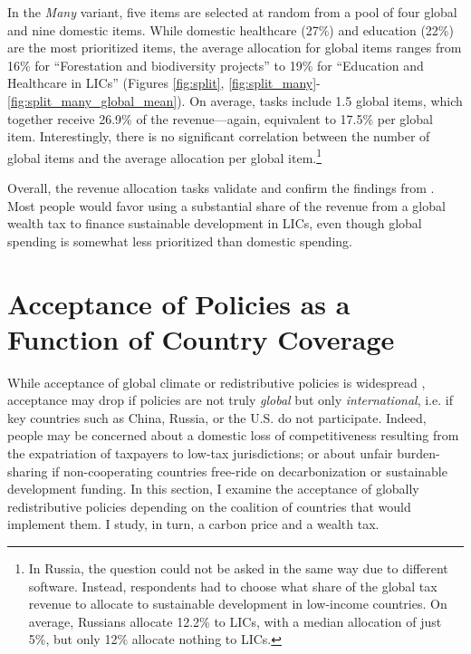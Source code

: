 \documentclass[12pt,english]{article}
\begin{document}
\begin{bibunit}
In the \textit{Many} variant, five items are selected at random from a pool of four global and nine domestic items. While domestic healthcare (27\%)
and education (22\%)
are the most prioritized items, the average allocation for global items ranges from 16\%
for ``Forestation and biodiversity projects'' to 19\%
for ``Education and Healthcare in LICs'' (Figures \ref{fig:split}, \ref{fig:split_many}-\ref{fig:split_many_global_mean}). On average, tasks include 1.5 global items, which together receive 26.9\% of the revenue---again, equivalent to 17.5\% per global item. Interestingly, there is no significant correlation between the number of global items and the average allocation per global item.\footnote{In Russia, the question could not be asked in the same way due to different software. Instead, respondents had to choose what share of the global tax revenue to allocate to sustainable development in low-income countries. On average, Russians allocate 12.2\% to LICs, with a median allocation of just 5\%, but only 12\% allocate nothing to LICs.} %

Overall, the revenue allocation tasks validate and confirm the findings from \cite{fabre_majority_2025}. Most people would favor using a substantial share of the revenue from a global wealth tax to finance sustainable development in LICs, even though global spending is somewhat less prioritized than domestic spending.


\section{Acceptance of %
Policies as a Function of Country Coverage\label{sec:coverage}}

While acceptance of global climate or redistributive policies is widespread \citep{fabre_majority_2025,cappelen_majority_2025}, acceptance may drop if policies are not truly \textit{global} but only \textit{international}, i.e. if key countries such as China, Russia, or the U.S. do not participate. Indeed, people may be concerned about a domestic loss of competitiveness resulting from the expatriation of taxpayers to low-tax jurisdictions; or about unfair burden-sharing if non-cooperating countries free-ride on decarbonization or sustainable development funding.
In this section, I examine the acceptance of globally redistributive policies depending on the coalition of countries that would implement them. I study, in turn, a carbon price and a wealth tax.


\end{bibunit}
\end{document}
